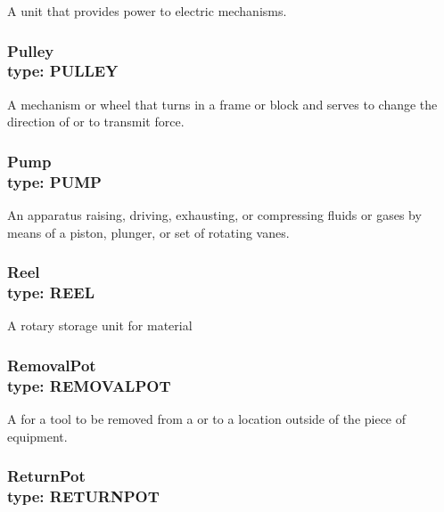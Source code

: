 A unit that provides power to electric mechanisms.



\subsubsection[Pulley]{Pulley \\ {\small type: PULLEY}}
\label{sec:Pulley}



A mechanism or wheel that turns in a frame or block and serves to change the direction of or to transmit force.



\subsubsection[Pump]{Pump \\ {\small type: PUMP}}
\label{sec:Pump}



An apparatus raising, driving, exhausting, or compressing fluids or gases by means of a piston, plunger, or set of rotating vanes.



\subsubsection[Reel]{Reel \\ {\small type: REEL}}
\label{sec:Reel}



A rotary storage unit for material



\subsubsection[RemovalPot]{RemovalPot \\ {\small type: REMOVAL\textunderscore POT}}
\label{sec:RemovalPot}



A  for a tool to be removed from a  or  to a location outside of the piece of equipment.



\subsubsection[ReturnPot]{ReturnPot \\ {\small type: RETURN\textunderscore POT}}
\label{sec:ReturnPot}




